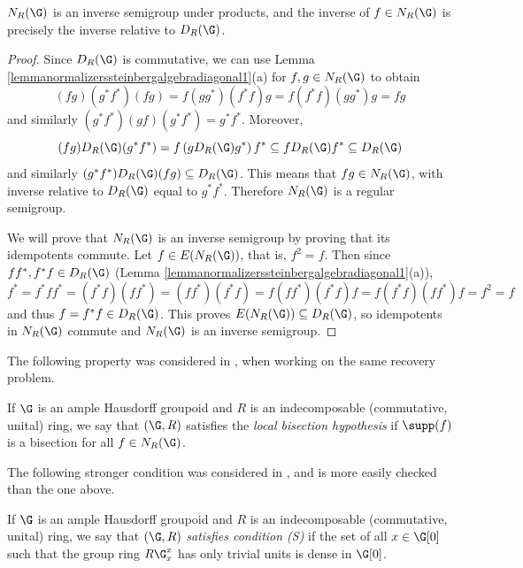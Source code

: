 \begin{proposition}\label{propositionNRGisinversesemigroup}
$N_R(\G)$ is an inverse semigroup under products, and the inverse of $f\in N_R(\G)$ is precisely the inverse relative to $D_R(\G)$.
\end{proposition}
\begin{proof}
Since $D_R(\G)$ is commutative, we can use Lemma \ref{lemmanormalizerssteinbergalgebradiagonal1}(a) for $f,g\in N_R(\G)$ to obtain
\[(fg)(g^*f^*)(fg)=f(gg^*)(f^*f)g=f(f^*f)(gg^*)g=fg\]
and similarly $(g^*f^*)(gf)(g^*f^*)=g^*f^*$. Moreover,
\[(fg)D_R(\G)(g^*f^*)=f\left(gD_R(\G)g^*\right)f^*\subseteq fD_R(\G)f^*\subseteq D_R(\G)\]
and similarly $(g^*f^*)D_R(\G)(fg)\subseteq D_R(\G)$. This means that $fg\in N_R(\G)$, with inverse relative to $D_R(\G)$ equal to $g^*f^*$. Therefore $N_R(\G)$ is a regular semigroup.

We will prove that $N_R(\G)$ is an inverse semigroup by proving that its idempotents commute. Let $f\in E(N_R(\G))$, that is, $f^2=f$. Then since $ff^*,f^*f\in D_R(\G)$ (Lemma \ref{lemmanormalizerssteinbergalgebradiagonal1}(a)),
\[f^*=f^*ff^*=(f^*f)(ff^*)=(ff^*)(f^*f)=f(ff^*)(f^*f)f=f(f^*f)(ff^*)f=f^2=f\]
and thus $f=f^*f\in D_R(\G)$. This proves $E(N_R(\G))\subseteq D_R(\G)$, so idempotents in $N_R(\G)$ commute and $N_R(\G)$ is an inverse semigroup.\qedhere
\end{proof}

The following property was considered in \cite{arxiv1711.01903v2}, when working on the same recovery problem.

\begin{definition}\label{definitionlocalbisectionhypothesis}
If $\G$ is an ample Hausdorff groupoid and $R$ is an indecomposable (commutative, unital) ring, we say that $(\G,R)$ satisfies the \emph{local bisection hypothesis} if $\supp(f)$ is a bisection for all $f\in N_R(\G)$.
\end{definition}

The following stronger condition was considered in \cite{carlsenrout2017}, and is more easily checked than the one above.%

\begin{definition}
If $\G$ is an ample Hausdorff groupoid and $R$ is an indecomposable (commutative, unital) ring, we say that $(\G,R)$ \emph{satisfies condition (S)} if the set of all $x\in\G[0]$ such that the group ring $R\G_x^x$ has only trivial units is dense in $\G[0]$.\nocite{MR3743184}
\end{definition}

